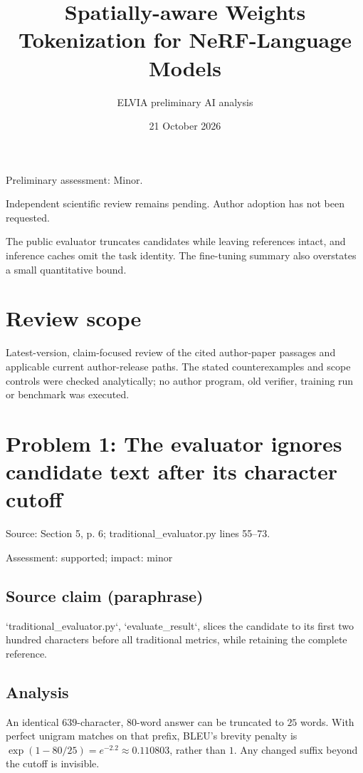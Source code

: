 \documentclass[11pt]{article}
\begin{document}
\title{Spatially-aware Weights Tokenization for NeRF-Language Models}

\author{ELVIA preliminary AI analysis}\date{21 October 2026}\maketitle

Preliminary assessment: Minor.\par

Independent scientific review remains pending. Author adoption has not been requested.

The public evaluator truncates candidates while leaving references intact, and inference caches omit the task identity. The fine-tuning summary also overstates a small quantitative bound.

\section*{Review scope}

Latest-version, claim-focused review of the cited author-paper passages and applicable current author-release paths. The stated counterexamples and scope controls were checked analytically; no author program, old verifier, training run or benchmark was executed.

\section*{Problem 1: The evaluator ignores candidate text after its character cutoff}

Source: Section 5, p. 6; traditional\_evaluator.py lines 55–73.

Assessment: supported; impact: minor

\subsection*{Source claim (paraphrase)}

`traditional\_evaluator.py`, `evaluate\_result`, slices the candidate to its first two hundred characters before all traditional metrics, while retaining the complete reference.

\subsection*{Analysis}

An identical \(639\)-character, \(80\)-word answer can be truncated to \(25\) words. With perfect unigram matches on that prefix, BLEU’s brevity penalty is \(\exp(1-80/25)=e^{-2.2}\approx0.110803\), rather than \(1\). Any changed suffix beyond the cutoff is invisible.
\end{document}
